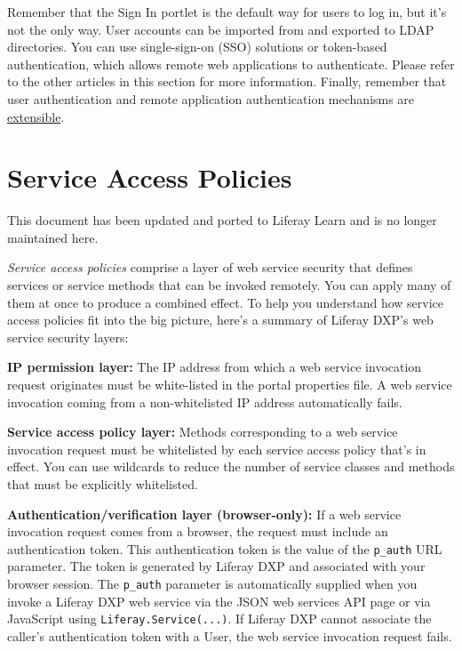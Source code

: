 Remember that the Sign In portlet is the default way for users to log
in, but it's not the only way. User accounts can be imported from and
exported to LDAP directories. You can use single-sign-on (SSO) solutions
or token-based authentication, which allows remote web applications to
authenticate. Please refer to the other articles in this section for
more information. Finally, remember that user authentication and remote
application authentication mechanisms are
\href{/docs/7-2/frameworks/-/knowledge_base/f/authentication-pipelines}{extensible}.

\chapter{Service Access Policies}\label{service-access-policies}

{This document has been updated and ported to Liferay Learn and is no
longer maintained here.}

\emph{Service access policies} comprise a layer of web service security
that defines services or service methods that can be invoked remotely.
You can apply many of them at once to produce a combined effect. To help
you understand how service access policies fit into the big picture,
here's a summary of Liferay DXP's web service security layers:

\textbf{IP permission layer:} The IP address from which a web service
invocation request originates must be white-listed in the portal
properties file. A web service invocation coming from a non-whitelisted
IP address automatically fails.

\textbf{Service access policy layer:} Methods corresponding to a web
service invocation request must be whitelisted by each service access
policy that's in effect. You can use wildcards to reduce the number of
service classes and methods that must be explicitly whitelisted.

\textbf{Authentication/verification layer (browser-only):} If a web
service invocation request comes from a browser, the request must
include an authentication token. This authentication token is the value
of the \texttt{p\_auth} URL parameter. The token is generated by Liferay
DXP and associated with your browser session. The \texttt{p\_auth}
parameter is automatically supplied when you invoke a Liferay DXP web
service via the JSON web services API page or via JavaScript using
\texttt{Liferay.Service(...)}. If Liferay DXP cannot associate the
caller's authentication token with a User, the web service invocation
request fails.

